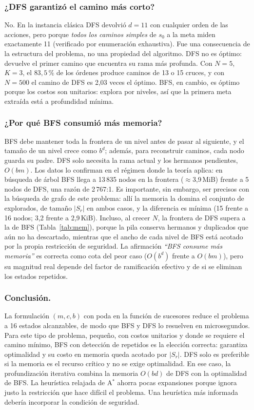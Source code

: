 \documentclass[runningheads]{llncs}
\newcommand{\Sr}{S_{r}}
\begin{document}
\subsubsection{¿DFS garantizó el camino más corto?}
No. En la instancia clásica DFS devolvió $d=11$ con cualquier orden de las
acciones, pero porque \emph{todos los caminos simples} de $s_0$ a la meta miden
exactamente 11 (verificado por enumeración exhaustiva). Fue una consecuencia de
la estructura del problema, no una propiedad del algoritmo. DFS no es óptimo:
devuelve el primer camino que encuentra su rama más profunda. Con $N=5$, $K=3$,
el $83{,}5$\,\% de los órdenes produce caminos de 13 o 15 cruces, y con $N=500$
el camino de DFS es 2{,}03 veces el óptimo. BFS, en cambio, es óptimo porque los
costos son unitarios: explora por niveles, así que la primera meta extraída está a
profundidad mínima.

\subsubsection{¿Por qué BFS consumió más memoria?}
BFS debe mantener toda la frontera de un nivel antes de pasar al siguiente, y el
tamaño de un nivel crece como $b^{d}$; además, para reconstruir caminos, cada nodo
guarda su padre. DFS solo necesita la rama actual y los hermanos pendientes,
$O(bm)$. Los datos lo confirman en el régimen donde la teoría aplica: en búsqueda de
árbol BFS llega a 13\,835 nodos en la frontera ($\approx$3{,}9\,MiB) frente a 5
nodos de DFS, una razón de 2\,767:1. Es importante, sin embargo, ser precisos con
la búsqueda de grafo de este problema: allí la memoria la domina el conjunto de
explorados, de tamaño $|\Sr|$ en ambos casos, y la diferencia es mínima
(15 frente a 16 nodos; 3{,}2 frente a 2{,}9\,KiB). Incluso, al crecer $N$, la
frontera de DFS supera a la de BFS (Tabla~\ref{tab:mem}), porque la pila conserva
hermanos y duplicados que aún no ha descartado, mientras que el ancho de cada
nivel de BFS está acotado por la propia restricción de seguridad. La afirmación
\emph{``BFS consume más memoria''} es correcta como cota del peor caso
($O(b^d)$ frente a $O(bm)$), pero su magnitud real depende del factor de
ramificación efectivo y de si se eliminan los estados repetidos.

\subsubsection{Conclusión.}
La formulación $(m,c,b)$ con poda en la función de sucesores reduce el problema a
16 estados alcanzables, de modo que BFS y DFS lo resuelven en microsegundos.
Para este tipo de problema, pequeño, con costos unitarios y donde se requiere el
camino mínimo, BFS con detección de repetidos es la elección correcta: garantiza
optimalidad y su costo en memoria queda acotado por $|\Sr|$. DFS solo es
preferible si la memoria es el recurso crítico y no se exige optimalidad. En ese
caso, la profundización iterativa \cite{korf1985} combina la memoria $O(bd)$
de DFS con la optimalidad de BFS. La heurística relajada de A$^*$ ahorra pocas
expansiones porque ignora justo la restricción que hace difícil el problema. Una
heurística más informada debería incorporar la condición de seguridad.
\end{document}
